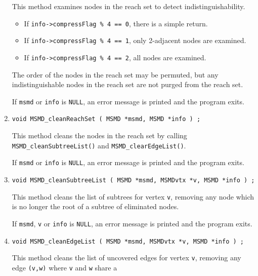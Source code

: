\begin{enumerate}
This method examines nodes in the reach set to detect
indistinguishability.
\begin{itemize}
\item
If {\tt info->compressFlag \% 4 == 0}, there is a simple return.
\item
If {\tt info->compressFlag \% 4 == 1}, only 2-adjacent nodes are
examined.
\item
If {\tt info->compressFlag \% 4 == 2}, all nodes are examined.
\end{itemize}
The order of the nodes in the reach set may be permuted, but any
indistinguishable nodes in the reach set are not purged from the
reach set.
\par {}
If {\tt msmd} or {\tt info} is {\tt NULL},
an error message is printed and the program exits.
\item
\begin{verbatim}
void MSMD_cleanReachSet ( MSMD *msmd, MSMD *info ) ;
\end{verbatim}
This method cleans the nodes in the reach set by calling
{\tt MSMD\_cleanSubtreeList()}
and {\tt MSMD\_clearEdgeList()}.
\par {}
If {\tt msmd} or {\tt info} is {\tt NULL},
an error message is printed and the program exits.
\item
\begin{verbatim}
void MSMD_cleanSubtreeList ( MSMD *msmd, MSMDvtx *v, MSMD *info ) ;
\end{verbatim}
This method cleans the list of subtrees for vertex {\tt v},
removing any node which is no longer the root of a subtree of
eliminated nodes.
\par {}
If {\tt msmd}, {\tt v} or {\tt info} is {\tt NULL},
an error message is printed and the program exits.
\item
\begin{verbatim}
void MSMD_cleanEdgeList ( MSMD *msmd, MSMDvtx *v, MSMD *info ) ;
\end{verbatim}
This method cleans the list of uncovered edges for vertex {\tt v},
removing any edge {\tt (v,w)} where {\tt v} and {\tt w} share a

\end{enumerate}
